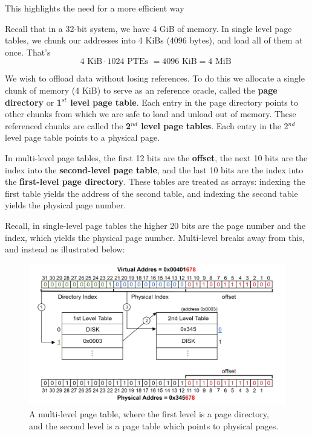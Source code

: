 \noindent
This highlights the need for a more efficient way 
\begin{Def}

    Recall that in a 32-bit system, we have 4 GiB of memory. In single level page tables, we chunk our addresses into 4 KiBs (4096 bytes), 
    and load all of them at once. That's
    $$4 \text{ KiB} \cdot 1024 \text{ PTEs } = 4096 \text{ KiB} = 4 \text{ MiB }$$

    \noindent
    We wish to offload data without losing references. To do this we allocate a single chunk of memory (4 KiB) to 
    serve as an reference oracle, called the \textbf{page directory} or \textbf{1$^{st}$ level page table}. Each entry in the page directory points to other chunks from which we are safe to load and unload out of memory.
    These referenced chunks are called the \textbf{2$^{nd}$ level page tables}. Each entry in the 2$^{nd}$ level page table points to a physical page.
\end{Def}

\begin{Def}

    In multi-level page tables, the first 12 bits are the \textbf{offset}, the next 10 bits are the index into the \textbf{second-level page table}, and the last 10 bits are the index into the \textbf{first-level page directory}. These tables are treated as arrays: indexing the first table yields the address of the second table, and indexing the second table yields the physical page number.
\end{Def}

\newpage 

\noindent
Recall, in single-level page tables the higher 20 bits are the page number and the index, which yields the physical page number.
Multi-level breaks away from this, and instead as illustrated below:
\begin{figure}[h]
    \centering
    \includegraphics[width=\textwidth]{Sections/virt/level.png}
    
    \vspace{1em}
    \caption{A multi-level page table, where the first level is a page directory, and the second level is a page table which points to physical pages.}
    
    \label{fig:virt8}
\end{figure}

